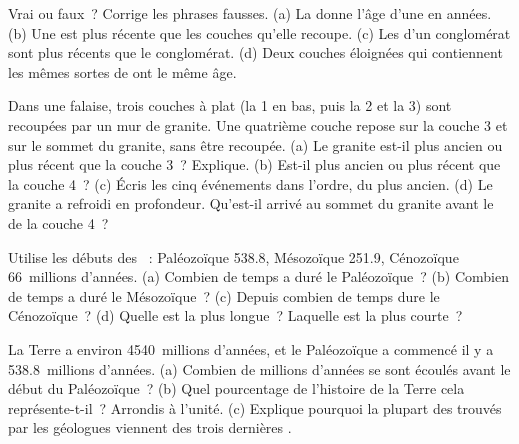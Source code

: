 \begin{exercise}[$\star$]\label{exo:g7:geological-time:4}
Vrai ou faux~? Corrige les phrases fausses. (a) La  donne
l'âge d'une  en années. (b) Une  est plus récente que les
couches qu'elle recoupe. (c) Les  d'un conglomérat sont plus récents
que le conglomérat. (d) Deux couches éloignées qui contiennent les mêmes
sortes de  ont le même âge.
\end{exercise}

\begin{exercise}[$\star\star$]\label{exo:g7:geological-time:5}
Dans une falaise, trois couches à plat (la 1 en bas, puis la 2 et la 3)
sont recoupées par un mur de granite. Une quatrième couche repose sur la
couche 3 et sur le sommet du granite, sans être recoupée. (a) Le granite
est-il plus ancien ou plus récent que la couche 3~? Explique. (b) Est-il
plus ancien ou plus récent que la couche 4~? (c) Écris les cinq
événements dans l'ordre, du plus ancien. (d) Le granite a refroidi en
profondeur. Qu'est-il arrivé au sommet du granite avant le  de la
couche 4~?
\end{exercise}

\begin{exercise}[$\star\star$]\label{exo:g7:geological-time:6}
Utilise les débuts des ~: Paléozoïque \num{538.8}, Mésozoïque
\num{251.9}, Cénozoïque \num{66}~millions d'années. (a) Combien de temps a
duré le Paléozoïque~? (b) Combien de temps a duré le Mésozoïque~? (c)
Depuis combien de temps dure le Cénozoïque~? (d) Quelle  est la plus
longue~? Laquelle est la plus courte~?
\end{exercise}

\begin{exercise}[$\star\star$]\label{exo:g7:geological-time:7}
La Terre a environ \num{4540}~millions d'années, et le Paléozoïque a
commencé il y a \num{538.8}~millions d'années. (a) Combien de millions
d'années se sont écoulés avant le début du Paléozoïque~? (b) Quel
pourcentage de l'histoire de la Terre cela représente-t-il~? Arrondis à
l'unité. (c) Explique pourquoi la plupart des  trouvés par les
géologues viennent des trois dernières .
\end{exercise}


